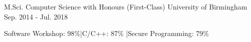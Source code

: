

\begin{cventries}

  \cventry
  {M.Sci. Computer Science with Honours (First-Class)} %
    {University of Birmingham} %
    {} %
    {Sep. 2014 - Jul. 2018} %
    {
      \begin{cvitems}
      \item {Software Workshop: 98\%\hspace*{3mm}|\hspace*{3mm}C/C++: 87\%
        \hspace*{3mm}|\hspace*{3mm}Secure Programming: 79\%}
      \end{cvitems}
    }


\end{cventries}
